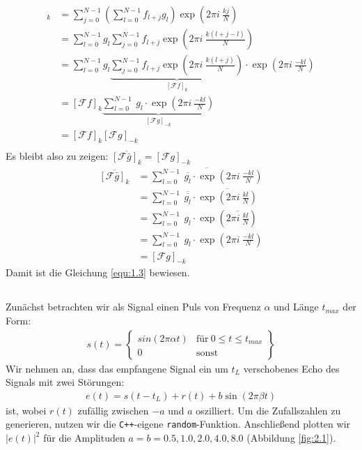 \documentclass[ngerman]{scrartcl}
\begin{document}
\begin{align*}
	[\mathcal{F}(f \odot g)]_{k}
	&= \sum_{j=0}^{N-1} \left( \sum_{l=0}^{N-1} f_{l+j} g_{l} \right)  \exp (2 \pi i ~\frac{kj}{N})\\
	&= \sum_{l=0}^{N-1} g_l \sum_{j=0}^{N-1} f_{l+j} \exp (2 \pi i ~\frac{k(l+j-l)}{N})\\
	&= \sum_{l=0}^{N-1} g_l \underbrace{\sum_{j=0}^{N-1} f_{l+j} \exp (2 \pi i ~\frac{k(l+j)}{N})}_{[\mathcal{F} f]_{k}} \cdot \exp (2 \pi i ~\frac{-kl}{N})\\
	&= [\mathcal{F} f]_{k} \underbrace{\sum_{l=0}^{N-1} ~ g_l \cdot \exp (2 \pi i ~\frac{-kl}{N})}_{[\mathcal{F} g]_{-k}}\\
	&= [\mathcal{F} f]_{k} [\mathcal{F} g]_{-k}\\
\end{align*}
Es bleibt also zu zeigen:
$\overline{[\mathcal{F} \bar{g}]_{k}}=[\mathcal{F} g]_{-k}$
\begin{align*}
	\overline{[\mathcal{F} \bar{g}]_{k}} &=\overline{\sum_{l=0}^{N-1} ~ \overline{g_l} \cdot \exp (2 \pi i ~\frac{-kl}{N})}\\
	&= \sum_{l=0}^{N-1} ~ \overline{\overline{g_l}} \cdot \overline{\exp (2 \pi i ~\frac{kl}{N})}\\
	&= \sum_{l=0}^{N-1} ~ g_l \cdot \exp (\overline{2 \pi i ~\frac{kl}{N}})\\
	&= \sum_{l=0}^{N-1} ~ g_l \cdot \exp (2 \pi i ~\frac{-kl}{N})\\
	&=[\mathcal{F} g]_{-k}
\end{align*}
Damit ist die Gleichung \ref{equ:1.3} bewiesen.
\subsection{}
\label{ssec:10.2}
Zunächst betrachten wir als Signal einen Puls
von Frequenz $\alpha$ und L\"ange $t_{max}$ der Form:
\begin{align}
	s(t)=\left\{\begin{matrix}sin(2\pi \alpha t) & \text{für} \ 0\leq t\leq t_{max}\\ 0 & \text{sonst} \end{matrix}\right\}
\end{align}
Wir nehmen an, dass das empfangene Signal ein um  $t_L$
verschobenes Echo des Signals mit zwei St\"orungen:
\begin{align}
	e(t)=s\left(t-t_{L}\right)+r(t)+b \sin (2 \pi \beta t)
\end{align}
ist, wobei $r(t)$ zuf\"allig zwischen $-a$ und $a$ oszilliert.
Um die Zufallszahlen zu generieren, nutzen wir die \verb|C++|-eigene
\verb|random|-Funktion.
Anschließend plotten wir $|e(t)|^2$
für die Amplituden $a=b=0.5, 1.0, 2.0, 4.0, 8.0$ (Abbildung \ref{fig:2.1}).
\end{document}

